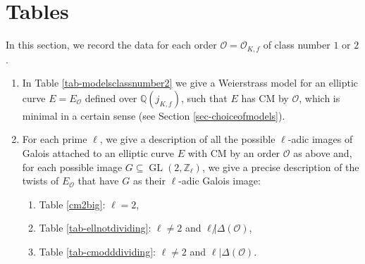 \documentclass[11pt]{amsart}
\theoremstyle{definition}
\newcommand{\Q}{\mathbb Q}
\newcommand{\Z}{\mathbb Z}
\newcommand{\GL}{\operatorname{GL}}
\begin{document}
\section{Tables}\label{sec-tables}
In this section, we record the data for each order $\mathcal{O}=\mathcal{O}_{K,f}$ of class number $1$ or $2$.
\begin{enumerate}
\item In Table  \ref{tab-modelsclassnumber2} we give a Weierstrass model for an elliptic curve $E=E_{\mathcal{O}}$ defined over $\Q(j_{K,f})$, such that $E$ has CM by $\mathcal{O}$, which is minimal in a certain sense (see Section \ref{sec-choiceofmodels}).
\item For each prime $\ell$, we give a description of all the possible $\ell$-adic images of Galois attached to an elliptic curve $E$ with CM by an order $\mathcal{O}$ as above and, for each possible image $G\subseteq \GL(2,\Z_\ell)$, we give a precise description of the twists of $E_{\mathcal{O}}$ that have $G$ as their $\ell$-adic Galois image:
\begin{enumerate}
\item[$\bullet$] Table \ref{cm2big}: $\ell =2$,
\item[$\bullet$] Table \ref{tab-ellnotdividing}: $\ell \ne 2$ and $\ell \not|\Delta(\mathcal O)$,
\item[$\bullet$] Table \ref{tab-cmodddividing}: $\ell \ne 2$ and $\ell |\Delta(\mathcal O)$.
\end{enumerate}
\end{enumerate}
\end{document}
